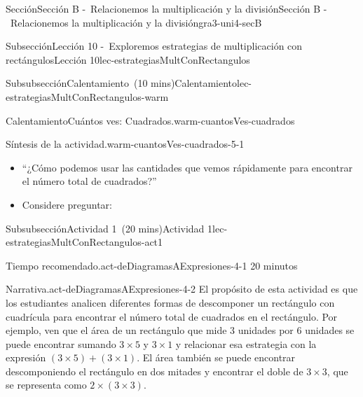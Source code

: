 \documentclass[oneside,10pt,]{article}
\newlength{\fillinmaxwidth}
\newlength{\fillincontract}
\newlength{\charmaxwidth}\setlength{\charmaxwidth}{0.5em}
\newlength{\charminwidth}\setlength{\charminwidth}{0.1em}
\newlength{\fillinheight}
\newcommand{\fillintext}[1]{%
\setlength{\fillinmaxwidth}{#1\charmaxwidth}%
\setlength{\fillincontract}{#1\charminwidth}%
\setlength{\fillinheight}{\baselineskip}\addtolength{\fillinheight}{1.2pt}%
\strut\nobreak\leaders\vbox{\hrule width 0.3pt height 0.3pt \vskip -1.2pt}\hskip 1\fillinmaxwidth minus \fillincontract\nobreak\strut%
}
\begin{document}
\begin{sectionptx}{Sección}{Sección B -~Relacionemos la multiplicación y la división}{}{Sección B -~Relacionemos la multiplicación y la división}{}{}{gra3-uni4-secB}
\begin{subsectionptx}{Subsección}{Lección 10 -~Exploremos estrategias de multiplicación con rectángulos}{}{Lección 10}{}{}{lec-estrategiasMultConRectangulos}
\begin{subsubsectionptx}{Subsubsección}{Calentamiento~(10 mins)}{}{Calentamiento}{}{}{lec-estrategiasMultConRectangulos-warm}
\begin{exploration}{Calentamiento}{Cuántos ves: Cuadrados.}{warm-cuantosVes-cuadrados}
\begin{itemize}[label=\textbullet]
\end{itemize}
\end{exploration}%
\par
\begin{paragraphs}{Síntesis de la actividad.}{warm-cuantosVes-cuadrados-5-1}%
%
\begin{itemize}[label=\textbullet]
\item{}``¿Cómo podemos usar las cantidades que vemos rápidamente para encontrar el número total de cuadrados?''%
\item{}Considere preguntar:%
%
\end{itemize}
\end{paragraphs}%
\end{subsubsectionptx}
%
%
\typeout{************************************************}
\typeout{************************************************}
%
\begin{subsubsectionptx}{Subsubsección}{Actividad 1~(20 mins)}{}{Actividad 1}{}{}{lec-estrategiasMultConRectangulos-act1}
\par
\begin{paragraphs}{Tiempo recomendado.}{act-deDiagramasAExpresiones-4-1}%
20 minutos%
\end{paragraphs}%
\begin{paragraphs}{Narrativa.}{act-deDiagramasAExpresiones-4-2}%
El propósito de esta actividad es que los estudiantes analicen diferentes formas de descomponer un rectángulo con cuadrícula para encontrar el número total de cuadrados en el rectángulo. Por ejemplo, ven que el área de un rectángulo que mide 3 unidades por 6 unidades se puede encontrar sumando \(3 \times 5\) y \(3 \times 1\) y relacionar esa estrategia con la expresión \((3 \times 5) + (3 \times 1)\). El área también se puede encontrar descomponiendo el rectángulo en dos mitades y encontrar el doble de \(3 \times 3\), que se representa como \(2 \times (3 \times 3)\).%
\par

\end{paragraphs}
\end{subsubsectionptx}
\end{subsectionptx}
\end{sectionptx}
\end{document}
